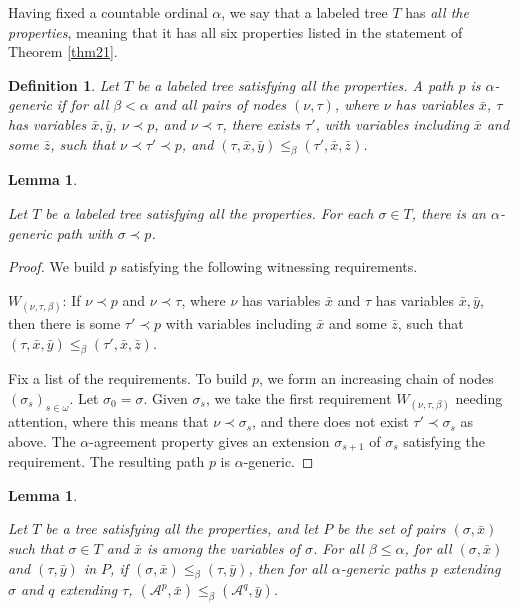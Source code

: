 \documentclass{article}
\newtheorem{lem}[thm]{Lemma}
\newtheorem{defn}{Definition}
\begin{document}
Having fixed a countable ordinal $\alpha$, we say that a labeled tree $T$ has \emph{all the properties}, meaning that it has all six properties listed in the statement of Theorem \ref{thm21}.  
\begin{defn}

Let $T$ be a labeled tree satisfying all the properties.  A path $p$ is \emph{$\alpha$-generic} if for all $\beta < \alpha$ and all pairs of nodes $(\nu,\tau)$, where $\nu$ has variables $\bar{x}$, $\tau$ has variables $\bar{x},\bar{y}$, $\nu\prec p$, and $\nu\prec\tau$, there exists $\tau'$, with variables  including $\bar{x}$ and some $\bar{z}$, such that $\nu\prec\tau'\prec p$, and $(\tau,\bar{x},\bar{y})\leq_\beta (\tau',\bar{x},\bar{z})$. 

\end{defn}

\begin{lem} 
\label{lem22}

Let $T$ be a labeled tree satisfying all the properties.  For each $\sigma\in T$, there is an $\alpha$-generic path with $\sigma\prec p$.   

\end{lem}

\begin{proof}

We build $p$ satisfying the following witnessing requirements.

\bigskip
\noindent
\textbf{$W_{(\nu,\tau,\beta)}$}:  If $\nu\prec p$ and $\nu\prec\tau$, where $\nu$ has variables $\bar{x}$ and $\tau$ has variables $\bar{x},\bar{y}$, then there is some $\tau'\prec p$ with variables including $\bar{x}$ and some $\bar{z}$, such that
$(\tau,\bar{x},\bar{y})\leq_\beta(\tau',\bar{x},\bar{z})$.

\bigskip

Fix a list of the requirements.  To build $p$, we form an increasing chain of nodes $(\sigma_s)_{s\in\omega}$.  Let $\sigma_0 = \sigma$.  Given $\sigma_s$, we take the first requirement $W_{(\nu,\tau,\beta)}$ needing attention, where this means that $\nu\prec\sigma_s$, and there does not exist $\tau'\prec\sigma_s$ as above.  The $\alpha$-agreement property gives an extension $\sigma_{s+1}$ of $\sigma_s$ satisfying the requirement.  The resulting path $p$ is $\alpha$-generic.  
\end{proof}

\begin{lem}
\label{lem23}

Let $T$ be a tree satisfying all the properties, and let $P$ be the set of pairs $(\sigma,\bar{x})$ such that $\sigma\in T$ and $\bar{x}$ is among the variables of $\sigma$.  For all $\beta\leq\alpha$, for all $(\sigma,\bar{x})$ and $(\tau,\bar{y})$ in $P$, if $(\sigma,\bar{x})\leq_\beta(\tau,\bar{y})$, then for all $\alpha$-generic paths $p$ extending $\sigma$ and $q$ extending $\tau$, 
$(\mathcal{A}^p,\bar{x})\leq_\beta(\mathcal{A}^q,\bar{y})$.   

\end{lem}
\end{document}

